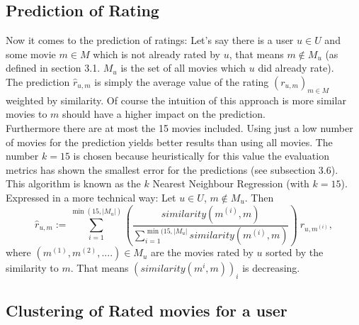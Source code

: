 \documentclass{article}
\begin{document}
\subsection{Prediction of Rating}

Now it comes to the prediction of ratings: Let's say there is a user $u\in U$ and some movie $m\in M$ which is not already rated by $u$, that means $m\notin M_u$ (as defined in section 3.1. $M_u$ is the set of all movies which $u$ did already rate).\\
The prediction $\hat{r}_{u,m}$ is simply the average value of the rating $(r_{u,m})_{m\in M}$ weighted by similarity. Of course the intuition of this approach is more similar movies to $m$ should have a higher impact on the prediction.\\
Furthermore there are at most the 15 movies included. Using just a low number of movies for the prediction yields better results than using all movies. The number $k=15$ is chosen because heuristically for this value the evaluation metrics has shown the smallest error for the predictions (see subsection 3.6).\\
This algorithm is known as the $k$ Nearest Neighbour Regression (with $k=15$).\\[2ex]
Expressed in a more technical way: Let $u\in U$, $m\notin M_u$. Then
\[ \hat{r}_{u,m} := \sum_{i=1}^{\min(15, |M_u|)} \left(\frac{similarity(m^{(i)}, m)}{\sum_{i=1}^{\min(15, |M_u|} similarity(m^{(i)}, m)} \right)~r_{u, m^{(i)}},\]
where $(m^{(1)}, m^{(2)}, ....)\in M_u$ are the movies rated by $u$ sorted by the similarity to $m$. That means $(similarity(m^{i},m))_i$ is decreasing.


\subsection{Clustering of Rated movies for a user}
\end{document}
